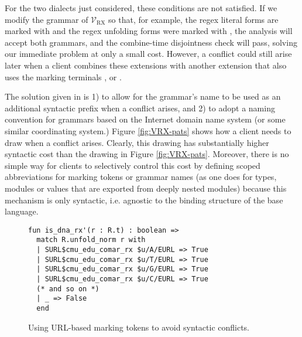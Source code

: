 {For the two dialects just considered, these conditions are not satisfied. If we modify the grammar of $\mathcal{V}_\text{RX}$ so that, for example, the regex literal forms are marked with  and the regex unfolding forms were marked with , the analysis will accept both grammars, and the combine-time disjointness check will pass, solving our immediate problem at only a small cost. However, a conflict could still  arise later when a client combines these extensions with another extension that also uses the marking terminals ,  or \li{/}. %

The solution given in \cite{conf/pldi/SchwerdfegerW09} is 1) to allow for the grammar's name to be used as an additional syntactic prefix when a conflict arises, and 2) to adopt a naming convention for grammars  based on the Internet domain name system (or some similar coordinating system.) Figure \ref{fig:VRX-pats} shows how a client needs to draw  when a conflict arises. Clearly, this drawing has substantially higher syntactic cost than the drawing in Figure \ref{fig:VRX-pats}. Moreover, there is no simple way for clients to selectively control this cost by defining scoped abbreviations for marking tokens or grammar names (as one does for types, modules or values that are exported from deeply nested modules) because this mechanism is only syntactic, i.e. agnostic to the binding structure of the base language.

\begin{figure}
\begin{lstlisting}[numbers=none]
fun is_dna_rx'(r : R.t) : boolean => 
  match R.unfold_norm r with 
  | SURL$cmu_edu_comar_rx $u/A/EURL => True 
  | SURL$cmu_edu_comar_rx $u/T/EURL => True
  | SURL$cmu_edu_comar_rx $u/G/EURL => True
  | SURL$cmu_edu_comar_rx $u/C/EURL => True
  (* and so on *)
  | _ => False
  end
\end{lstlisting}
\caption{Using URL-based marking tokens to avoid syntactic conflicts.}
\label{fig:vanwyk}
\end{figure}

}
